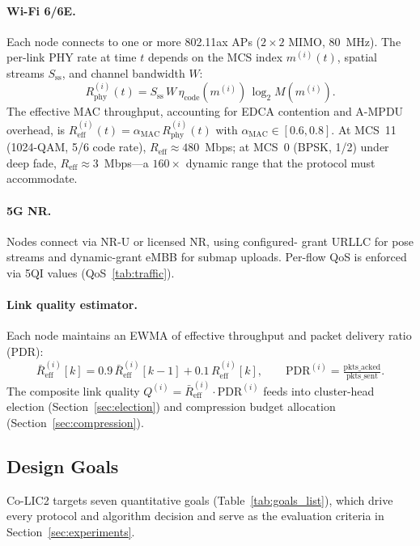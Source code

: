 \paragraph{Wi-Fi 6/6E.} Each node connects to one or more 802.11ax APs
($2\times2$ MIMO, 80~MHz). The per-link PHY rate at time $t$ depends on the
MCS index $m^{(i)}(t)$, spatial streams $S_{\text{ss}}$, and channel bandwidth
$W$:
\begin{equation}
  R_{\text{phy}}^{(i)}(t) = S_{\text{ss}} \, W \, \eta_{\text{code}}(m^{(i)}) \, \log_2 M(m^{(i)}).
\end{equation}
The effective MAC throughput, accounting for EDCA contention and A-MPDU
overhead, is $R_{\text{eff}}^{(i)}(t) = \alpha_{\text{MAC}} \, R_{\text{phy}}^{(i)}(t)$
with $\alpha_{\text{MAC}}\in[0.6,0.8]$. At MCS~11 (1024-QAM, 5/6 code rate),
$R_{\text{eff}}\approx 480$~Mbps; at MCS~0 (BPSK, 1/2) under deep fade,
$R_{\text{eff}}\approx 3$~Mbps---a $160\times$ dynamic range that the
protocol must accommodate.

\paragraph{5G NR.} Nodes connect via NR-U or licensed NR, using configured-
grant URLLC for pose streams and dynamic-grant eMBB for submap uploads.
Per-flow QoS is enforced via 5QI values (QoS~\ref{tab:traffic}).

\paragraph{Link quality estimator.} Each node maintains an EWMA of effective
throughput and packet delivery ratio (PDR):
\begin{equation}
  \bar{R}_{\text{eff}}^{(i)}[k] = 0.9\,\bar{R}_{\text{eff}}^{(i)}[k-1] + 0.1\,R_{\text{eff}}^{(i)}[k],
  \qquad
  \text{PDR}^{(i)} = \tfrac{\text{pkts\_acked}}{\text{pkts\_sent}}.
\end{equation}
The composite link quality $Q^{(i)} = \bar{R}_{\text{eff}}^{(i)}\cdot\text{PDR}^{(i)}$
feeds into cluster-head election (Section~\ref{sec:election}) and compression budget allocation
(Section~\ref{sec:compression}).

\subsection{Design Goals}

\label{sec:design}

Co-LIC2 targets seven quantitative goals (Table~\ref{tab:goals_list}), which
drive every protocol and algorithm decision and serve as the evaluation
criteria in Section~\ref{sec:experiments}.

